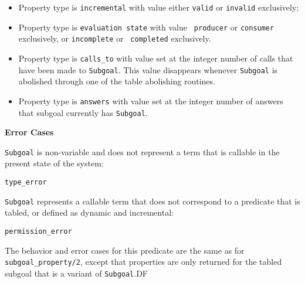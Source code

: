 \begin{description}
\begin{itemize}
\item Property type is {\tt incremental} with value either {\tt valid}
  or {\tt invalid} exclusively;
\item Property type is {\tt evaluation state} with value {\tt
  producer} or {\tt consumer} exclusively, or {\tt incomplete} or {\tt
  completed} exclusively.
\item Property type is {\tt calls\_to} with value set at the integer
  number of calls that have been made to {\tt Subgoal}.  This value
  disappears whenever {\tt Subgoal} is abolished through one of the
  table abolishing routines.
\item Property type is {\tt answers} with value set at the integer
  number of answers that subgoal currently has {\tt Subgoal}.
\end{itemize}

{\bf Error Cases}
\bi
\item {\tt Subgoal} is non-variable and does not represent a term that
  is callable in the present state of the system: 
\bi
 \item 	{\tt type\_error}
\ei
\item {\tt Subgoal} represents a callable term that does not
  correspond to a predicate that is tabled, or defined as dynamic and
  incremental:
\bi
\item 	{\tt permission\_error}
\ei
\ei

%
The behavior and error cases for this predicate are the same as for
{\tt subgoal\_property/2}, except that properties are only returned
for the tabled subgoal that is a variant of {\tt Subgoal}.DF


\end{description}
